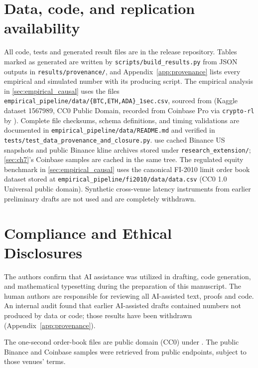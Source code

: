 \documentclass[10pt,twocolumn,letterpaper]{article}
\theoremstyle{definition}
\theoremstyle{remark}
\begin{document}
\section*{Data, code, and replication availability}
All code, tests and generated result files are in the release repository. Tables marked as generated are written by \texttt{scripts/build\_results.py} from JSON outputs in \texttt{results/provenance/}, and Appendix~\ref{app:provenance} lists every empirical and simulated number with its producing script. The empirical analysis in \cref{sec:empirical_causal} uses the files \texttt{empirical\_pipeline/data/\{BTC,ETH,ADA\}\_1sec.csv}, sourced from \citet{nielsen2021} (Kaggle dataset 1567989, CC0 Public Domain, recorded from Coinbase Pro via \texttt{crypto-rl} by \citeauthor{sadighian2019}). Complete file checksums, schema definitions, and timing validations are documented in \texttt{empirical\_pipeline/data/README.md} and verified in \texttt{tests/test\_data\_provenance\_and\_closure.py}.  use cached Binance US snapshots and public Binance kline archives stored under \texttt{research\_extension/}; \cref{sec:ch7}'s Coinbase samples are cached in the same tree. The regulated equity benchmark in \cref{sec:empirical_causal} uses the canonical FI-2010 limit order book dataset \citep{ntakaris2018benchmark} stored at \texttt{empirical\_pipeline/fi2010/data/data.csv} (CC0 1.0 Universal public domain). Synthetic cross-venue latency instruments from earlier preliminary drafts are not used and are completely withdrawn.

\section*{Compliance and Ethical Disclosures}
The authors confirm that AI assistance was utilized in drafting, code generation, and mathematical typesetting during the preparation of this manuscript. The human authors are responsible for reviewing all AI-assisted text, proofs and code. An internal audit found that earlier AI-assisted drafts contained numbers not produced by data or code; those results have been withdrawn (Appendix~\ref{app:provenance}).

The one-second order-book files are public domain (CC0) under \citet{nielsen2021}. The public Binance and Coinbase samples were retrieved from public endpoints, subject to those venues' terms.
\end{document}
